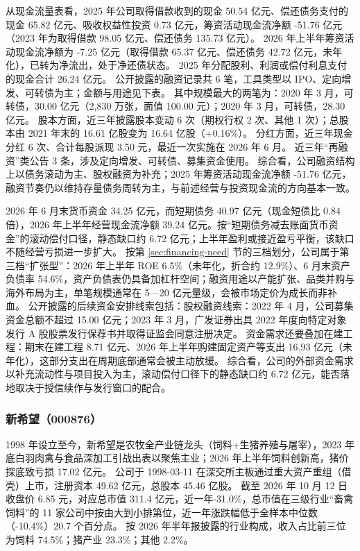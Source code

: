  从现金流量表看，2025 年公司取得借款收到的现金 50.54 亿元、偿还债务支付的现金 65.82 亿元、吸收权益性投资 0.73 亿元，筹资活动现金流净额 -51.76 亿元（2023 年为取得借款 98.05 亿元、偿还债务 135.73 亿元）。 2026 年上半年筹资活动现金流净额为 -7.25 亿元（取得借款 65.37 亿元、偿还债务 42.72 亿元，未年化），已转为净流出，处于净还债状态。 2025 年分配股利、利润或偿付利息支付的现金合计 26.24 亿元。 公开披露的融资记录共 6 笔，工具类型以 IPO、定向增发、可转债为主；金额与用途见下表。 其中规模最大的两笔为：2020 年 3 月，可转债，30.00 亿元（2,830 万张，面值 100.00 元）；2020 年 3 月，可转债，28.30 亿元。 股本方面，近三年披露股本变动 6 次（期权行权 2 次、其他 1 次）；总股本由 2021 年末的 16.61 亿股变为 16.64 亿股（+0.16\%）。 分红方面，近三年现金分红 6 次、合计每股派现 3.50 元，最近一次实施在 2026 年 6 月。 近三年“再融资”类公告 3 条，涉及定向增发、可转债、募集资金使用。 综合看，公司融资结构上以债务滚动为主、股权融资为补充；2025 年筹资活动现金流净额 -51.76 亿元，融资节奏仍以维持存量债务周转为主，与前述经营与投资现金流的方向基本一致。

 2026 年 6 月末货币资金 34.25 亿元，而短期债务 40.97 亿元（现金短债比 0.84 倍），2026 年上半年经营现金流净额 39.24 亿元。按“短期债务减去账面货币资金”的滚动偿付口径，静态缺口约 6.72 亿元；上半年盈利或接近盈亏平衡，该缺口不随经营亏损进一步扩大。 按第 \ref{sec:financing-need} 节的三档划分，公司属于第三档“扩张型”：2026 年上半年 ROE 6.5\%（未年化，折合约 12.9\%）、6 月末资产负债率 54.6\%，资产负债表仍具备加杠杆空间；融资用途以产能扩张、品类并购与海外布局为主，单笔规模通常在 5---20 亿元量级，会被市场定价为成长而非补血。 公开披露的后续资金安排线索包括：股权融资线索：2022 年 4 月，公司募集资金总额不超过 15.00 亿元；2023 年 3 月，广发证券出具 2022 年度向特定对象发行 A 股股票发行保荐书并取得证监会同意注册决定。 资金需求还要叠加在建工程：期末在建工程 8.71 亿元、2026 年上半年购建固定资产等支出 16.93 亿元（未年化），这部分支出在周期底部通常会被主动放缓。 综合看，公司的外部资金需求以补充流动性与项目投入为主，滚动偿付口径下的静态缺口约 6.72 亿元，能否落地取决于授信续作与发行窗口的配合。




\subsubsection{新希望（000876）}
\label{co:000876}

 1998 年设立至今，新希望是农牧全产业链龙头（饲料+生猪养殖与屠宰），2023 年底白羽肉禽与食品深加工引战出表以聚焦主业；2026 年上半年饲料创新高，猪价探底致亏损 17.02 亿元。 公司于 1998-03-11 在深交所主板通过重大资产重组（借壳）上市，注册资本 49.62 亿元，总股本 45.46 亿股。 截至 2026 年 10 月 12 日收盘价 6.85 元，对应总市值 311.4 亿元，近一年-31.0\%，总市值在三级行业“畜禽饲料”的 11 家公司中按由大到小排第位，近一年涨跌幅低于全样本中位数（-10.4\%）20.7 个百分点。 按 2026 年半年报披露的行业构成，收入占比前三位为饲料 74.5\%；猪产业 23.3\%；其他 2.2\%。

